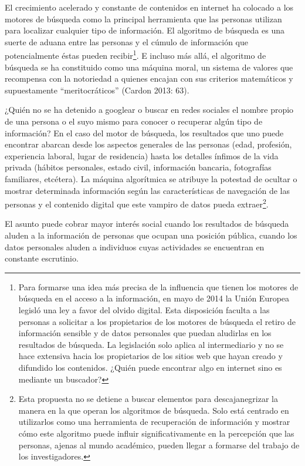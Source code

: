 \documentclass[
]{interact}
\begin{document}
El crecimiento acelerado y constante de contenidos en internet ha
colocado a los motores de búsqueda como la principal herramienta que las
personas utilizan para localizar cualquier tipo de información. El
algoritmo de búsqueda es una suerte de aduana entre las personas y el
cúmulo de información que potencialmente éstas pueden
recibir\footnote{Para formarse una idea más precisa de la influencia que
  tienen los motores de búsqueda en el acceso a la información, en mayo
  de 2014 la Unión Europea legisló una ley a favor del olvido digital.
  Esta disposición faculta a las personas a solicitar a los propietarios
  de los motores de búsqueda el retiro de información sensible y de
  datos personales que puedan aludirlas en los resultados de búsqueda.
  La legislación solo aplica al intermediario y no se hace extensiva
  hacia los propietarios de los sitios web que hayan creado y difundido
  los contenidos. ¿Quién puede encontrar algo en internet sino es
  mediante un buscador?}. E incluso más allá, el algoritmo de búsqueda
se ha constituido como una máquina moral, un sistema de valores que
recompensa con la notoriedad a quienes encajan con sus criterios
matemáticos y supuestamente ``meritocráticos'' (Cardon 2013: 63).

¿Quién no se ha detenido a googlear o buscar en redes sociales el nombre
propio de una persona o el suyo mismo para conocer o recuperar algún
tipo de información? En el caso del motor de búsqueda, los resultados
que uno puede encontrar abarcan desde los aspectos generales de las
personas (edad, profesión, experiencia laboral, lugar de residencia)
hasta los detalles ínfimos de la vida privada (hábitos personales,
estado civil, información bancaria, fotografías familiares, etcétera).
La máquina algorítmica se atribuye la potestad de ocultar o mostrar
determinada información según las características de navegación de las
personas y el contenido digital que este vampiro de datos pueda
extraer\footnote{Esta propuesta no se detiene a buscar elementos para
  descajanegrizar la manera en la que operan los algoritmos de búsqueda.
  Solo está centrado en utilizarlos como una herramienta de recuperación
  de información y mostrar cómo este algoritmo puede influir
  significativamente en la percepción que las personas, ajenas al mundo
  académico, pueden llegar a formarse del trabajo de los investigadores.}.

El asunto puede cobrar mayor interés social cuando los resultados de
búsqueda aluden a la información de personas que ocupan una posición
pública, cuando los datos personales aluden a individuos cuyas
actividades se encuentran en constante escrutinio.
\end{document}

